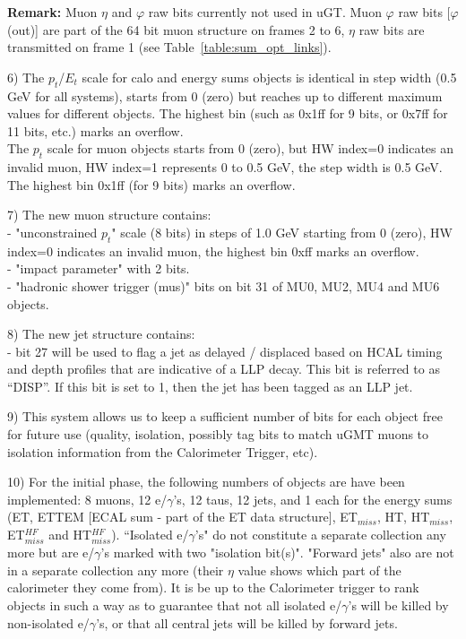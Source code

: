 \documentclass{cmspaper}
\begin{document}
\textbf{Remark:} Muon $\eta$ and $\varphi$ raw bits currently not used in uGT. Muon $\varphi$ raw bits [$\varphi$ (out)] are part of the 64 bit muon structure on frames 2 to 6, $\eta$ raw bits are transmitted on frame 1 (see Table~\ref{table:sum_opt_links}).

6) The $p_t$/$E_t$ scale for calo and energy sums objects is identical in step width (0.5 GeV for all systems), starts from 0 (zero) but reaches up to different maximum values for different objects. The highest bin (such as 0x1ff for 9 bits, or 0x7ff for 11 bits, etc.) marks an overflow.\\
The $p_t$ scale for muon objects starts from 0 (zero), but HW index=0 indicates an invalid muon, HW index=1 represents 0 to 0.5 GeV, the step width is 0.5 GeV. The highest bin 0x1ff (for 9 bits) marks an overflow.

7) The new muon structure contains:\\
- "unconstrained $p_t$" scale (8 bits) in steps of 1.0 GeV starting from 0 (zero), HW index=0 indicates an invalid muon, the highest bin 0xff marks an overflow.\\
- "impact parameter" with 2 bits.\\
- "hadronic shower trigger (mus)" bits on bit 31 of MU0, MU2, MU4 and MU6 objects.

8) The new jet structure contains:\\
- bit 27 will be used to flag a jet as delayed / displaced based on HCAL timing and depth profiles that are indicative of a LLP decay. This bit is referred to as “DISP”. If this bit is set to 1, then the jet has been tagged as an LLP jet.

9) This system allows us to keep a sufficient number of bits for each object free for future use (quality, isolation, possibly tag bits to match uGMT muons to isolation information from the Calorimeter Trigger, etc).

10) For the initial phase, the following numbers of objects are have been implemented: 8 muons, 12 e/$\gamma$'s, 12 taus, 12 jets, and 1 each for the energy sums (ET, ETTEM [ECAL sum - part of the ET data structure], ET$_{miss}$, HT, HT$_{miss}$, ET$_{miss}^{HF}$ and HT$_{miss}^{HF}$).
``Isolated e/$\gamma$'s" do not constitute a separate collection any more but are e/$\gamma$'s marked with two "isolation bit(s)". "Forward jets" also are not in a separate collection any more (their $\eta$ value shows which part of the calorimeter they come from). It is be up to the Calorimeter trigger to rank objects in such a way as to guarantee that not all isolated e/$\gamma$'s will be killed by non-isolated e/$\gamma$'s, or that all central jets will be killed by forward jets.
\end{document}
